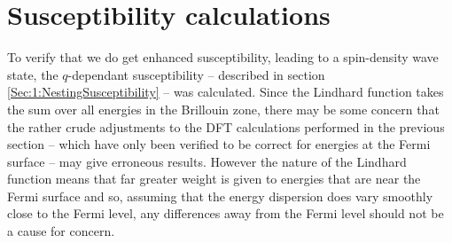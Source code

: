 
\section{Susceptibility calculations}
    \label{Sec:3:SubsceptibilityCalculation}


To verify that we do get enhanced susceptibility, leading to a spin-density wave state, the $q$-dependant susceptibility -- described in section \ref{Sec:1:NestingSusceptibility} -- was calculated. Since the Lindhard function takes the sum over all energies in the Brillouin zone, there may be some concern that the rather crude adjustments to the DFT calculations performed in the previous section -- which have only been verified to be correct for energies at the Fermi surface -- may give erroneous results. However the nature of the Lindhard function means that far greater weight is given to energies that are near the Fermi surface and so, assuming that the energy dispersion does vary smoothly close to the Fermi level, any differences away from the Fermi level should not be a cause for concern.

